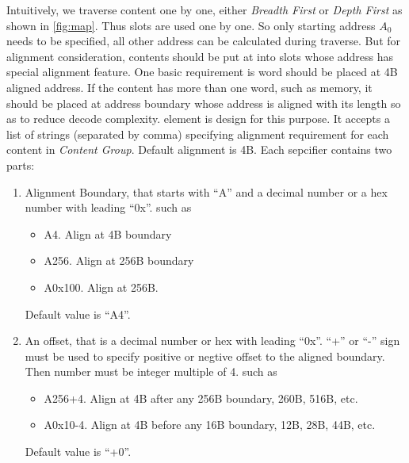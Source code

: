 \documentclass[10pt,oneside]{book}
\begin{document}
Intuitively, we traverse content one by one, either \emph{Breadth
  First} or \emph{Depth First} as shown in \autoref{fig:map}. Thus
slots are used one by one. So only starting address $A_0$ needs to be 
specified, all other address can be calculated during traverse. 
But for alignment consideration, contents
should be put at into slots whose address has special alignment
feature. One basic requirement is \gls{word} should be placed at 4B
aligned address. If the content has more than one \gls{word}, such 
as memory, it should be placed at address boundary whose address 
is aligned with its length so as to reduce decode complexity. 
 element is design for this purpose. 
It accepts a list of strings (separated by comma) specifying alignment
requirement for each content in \emph{Content Group}. Default alignment
is 4B. Each sepcifier contains two parts:
\begin{enumerate}
\item Alignment Boundary, that starts with ``A'' and a decimal number or 
  a hex number with leading ``0x''. such as
  \begin{itemize}
    \item A4. Align at 4B boundary
    \item A256. Align at 256B boundary
    \item A0x100. Align at 256B.
  \end{itemize}
  Default value is ``A4''. 

\item An offset, that is a decimal number or hex with leading ``0x''. ``+'' or 
  ``-'' sign must be used to specify positive or negtive offset to the aligned 
  boundary. Then number must be integer multiple of 4. such as
  \begin{itemize}
    \item A256+4. Align at 4B after any 256B boundary, 260B, 516B, etc. 
    \item A0x10-4. Align at 4B before any 16B boundary, 12B, 28B, 44B, etc.  
  \end{itemize}
  Default value is ``+0''.
\end{enumerate}
\end{document}
